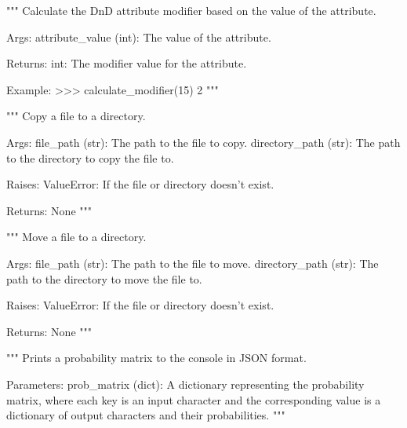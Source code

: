 \begin{codebox}
"""
Calculate the DnD attribute modifier based on the value of the attribute.

Args:
    attribute_value (int): The value of the attribute.

Returns:
    int: The modifier value for the attribute.

Example:
    >>> calculate_modifier(15)
    2
"""
\end{codebox}

\begin{codebox}
"""
Copy a file to a directory.

Args:
    file_path (str): The path to the file to copy.
    directory_path (str): The path to the directory to copy the file to.

Raises:
    ValueError: If the file or directory doesn't exist.

Returns:
    None
"""
\end{codebox}

\begin{codebox}
"""
Move a file to a directory.

Args:
    file_path (str): The path to the file to move.
    directory_path (str): The path to the directory to move the file to.

Raises:
    ValueError: If the file or directory doesn't exist.

Returns:
    None
"""
\end{codebox}

\begin{codebox}
"""
Prints a probability matrix to the console in JSON format.

Parameters:
    prob_matrix (dict): A dictionary representing the probability matrix,
    where each key is an input character and the corresponding value is a dictionary
    of output characters and their probabilities.
"""
\end{codebox}

